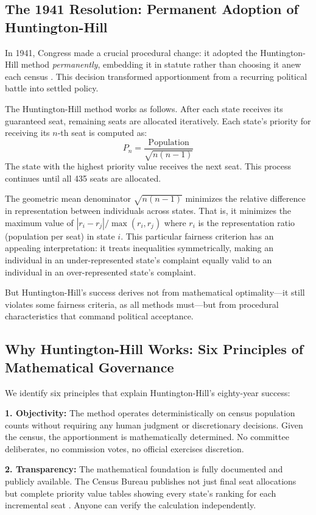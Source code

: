 \subsection{The 1941 Resolution: Permanent Adoption of Huntington-Hill}

In 1941, Congress made a crucial procedural change: it adopted the Huntington-Hill method \textit{permanently}, embedding it in statute rather than choosing it anew each census \cite{huntington1928method}. This decision transformed apportionment from a recurring political battle into settled policy.

The Huntington-Hill method works as follows. After each state receives its guaranteed seat, remaining seats are allocated iteratively. Each state's priority for receiving its $n$-th seat is computed as:
\[
P_n = \frac{\text{Population}}{\sqrt{n(n-1)}}
\]
The state with the highest priority value receives the next seat. This process continues until all 435 seats are allocated.

The geometric mean denominator $\sqrt{n(n-1)}$ minimizes the relative difference in representation between individuals across states. That is, it minimizes the maximum value of $|r_i - r_j| / \max(r_i, r_j)$ where $r_i$ is the representation ratio (population per seat) in state $i$. This particular fairness criterion has an appealing interpretation: it treats inequalities symmetrically, making an individual in an under-represented state's complaint equally valid to an individual in an over-represented state's complaint.

But Huntington-Hill's success derives not from mathematical optimality—it still violates some fairness criteria, as all methods must—but from procedural characteristics that command political acceptance.

\subsection{Why Huntington-Hill Works: Six Principles of Mathematical Governance}

We identify six principles that explain Huntington-Hill's eighty-year success:

\textbf{1. Objectivity:} The method operates deterministically on census population counts without requiring any human judgment or discretionary decisions. Given the census, the apportionment is mathematically determined. No committee deliberates, no commission votes, no official exercises discretion.

\textbf{2. Transparency:} The mathematical foundation is fully documented and publicly available. The Census Bureau publishes not just final seat allocations but complete priority value tables showing every state's ranking for each incremental seat \cite{census2020apportionment}. Anyone can verify the calculation independently.

